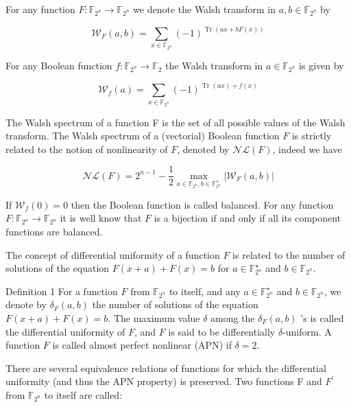 \documentclass[10pt]{article}
\begin{document}
For any function $F: \mathbb{F}_{2^{n}} \rightarrow \mathbb{F}_{2^{n}}$ we denote the Walsh transform in $a, b \in \mathbb{F}_{2^{n}}$ by

$$
\mathscr{W}_{F}(a, b)=\sum_{x \in \mathbb{F}_{2^{n}}}(-1)^{\operatorname{Tr}(a x+b F(x))}
$$

For any Boolean function $f: \mathbb{F}_{2^{n}} \rightarrow \mathbb{F}_{2}$ the Walsh transform in $a \in \mathbb{F}_{2^{n}}$ is given by

$$
\mathscr{W}_{f}(a)=\sum_{x \in \mathbb{F}_{2^{n}}}(-1)^{\operatorname{Tr}(a x)+f(x)}
$$

The Walsh spectrum of a function F is the set of all possible values of the Walsh transform. The Walsh spectrum of a (vectorial) Boolean function $F$ is strictly related to the notion of nonlinearity of $F$, denoted by $\mathscr{N} \mathscr{L}(F)$, indeed we have

$$
\mathscr{N} \mathscr{L}(F)=2^{n-1}-\frac{1}{2} \max _{a \in \mathbb{F}_{2^{n}}, b \in \mathbb{F}_{2^{n}}^{\star}}\left|\mathscr{W}_{F}(a, b)\right|
$$

If $\mathscr{W}_{f}(0)=0$ then the Boolean function is called balanced. For any function $F: \mathbb{F}_{2^{n}} \rightarrow \mathbb{F}_{2^{n}}$ it is well know that $F$ is a bijection if and only if all its component functions are balanced.

The concept of differential uniformity of a function $F$ is related to the number of solutions of the equation $F(x+a)+F(x)=b$ for $a \in \mathbb{F}_{2^{n}}^{\star}$ and $b \in \mathbb{F}_{2^{n}}$.

Definition 1 For a function $F$ from $\mathbb{F}_{2^{n}}$ to itself, and any $a \in \mathbb{F}_{2^{n}}^{\star}$ and $b \in \mathbb{F}_{2^{n}}$, we denote by $\delta_{F}(a, b)$ the number of solutions of the equation $F(x+a)+F(x)=b$. The maximum value $\delta$ among the $\delta_{F}(a, b)$ 's is called the differential uniformity of $F$, and $F$ is said to be differentially $\delta$-uniform. A function $F$ is called almost perfect nonlinear (APN) if $\delta=2$.

There are several equivalence relations of functions for which the differential uniformity (and thus the APN property) is preserved. Two functions F and $F^{\prime}$ from $\mathbb{F}_{2^{n}}$ to itself are called:
\end{document}

